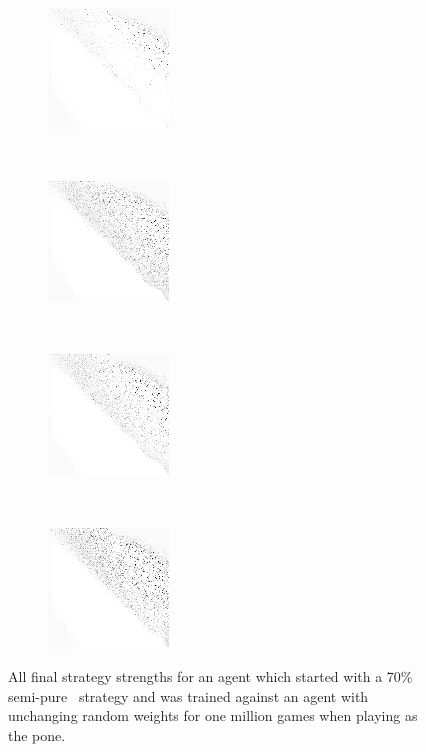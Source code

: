 \begin{figure}
	\begin{subfigure}[t]{0.22\textwidth}
		\includegraphics[width=\stratgraphwidth]{images/findings/experiments/starting_points/crib_min_avg.png}
		\caption{\cribminavg}
	\end{subfigure}
	~
	\begin{subfigure}[t]{0.22\textwidth}
		\includegraphics[width=\stratgraphwidth]{images/findings/experiments/starting_points/pegging_max_avg_gained.png}
		\caption{\peggingmaxavggained}
	\end{subfigure}
	~
	\begin{subfigure}[t]{0.22\textwidth}
		\includegraphics[width=\stratgraphwidth]{images/findings/experiments/starting_points/pegging_max_med_gained.png}
		\caption{\peggingmaxmedgained}
	\end{subfigure}
	~
	\begin{subfigure}[t]{0.22\textwidth}
		\includegraphics[width=\stratgraphwidth]{images/findings/experiments/starting_points/pegging_min_avg_given.png}
		\caption{\peggingminavggiven}
	\end{subfigure}

\caption{
	All final strategy strengths for an agent
	which started with a 70\% semi-pure \handmaxavg\ strategy
	and was trained against an agent with unchanging random weights
	for one million games
	when playing as the pone.
}
\label{fig:expts-sanitycheck-strats}
\end{figure}
